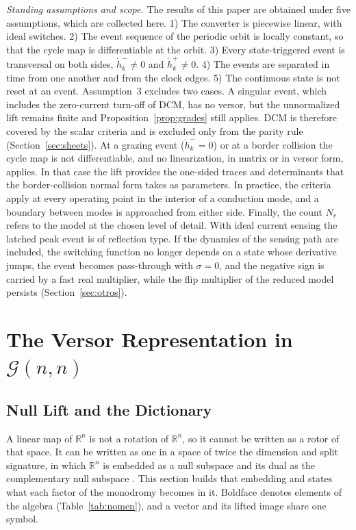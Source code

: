 \documentclass[journal]{IEEEtran}
\newcommand{\Gnn}{\mathcal{G}(n,n)}
\begin{document}
\emph{Standing assumptions and scope.} The results of this paper are obtained
under five assumptions, which are collected here. 1) The converter is
piecewise linear, with ideal switches. 2) The event sequence of the periodic
orbit is locally constant, so that the cycle map is differentiable at the
orbit. 3) Every state-triggered event is transversal on both sides,
$\dot h_k^{-}\neq0$ and $\dot h_k^{+}\neq0$. 4) The events are separated in
time from one another and from the clock edges. 5) The continuous state is
not reset at an event. Assumption~3 excludes two cases.
A singular event, which includes the zero-current turn-off of DCM, has no
versor, but the unnormalized lift remains finite and
Proposition~\ref{prop:grades} still applies. DCM is therefore covered by the
scalar criteria and is excluded only from the parity rule
(Section~\ref{sec:sheets}). At a grazing event ($\dot h_k^{-}=0$) or at a
border collision the cycle map is not differentiable, and no linearization,
in matrix or in versor form, applies. In that case the lift provides the
one-sided traces and determinants that the border-collision normal form
takes as parameters. In practice, the criteria apply at every operating
point in the interior of a conduction mode, and a boundary between modes is
approached from either side. Finally, the count $N_r$ refers to the model at
the chosen level of detail. With ideal current sensing the latched peak event
is of reflection type. If the dynamics of the sensing path are included, the
switching function no longer depends on a state whose derivative jumps, the
event becomes pass-through with $\sigma=0$, and the negative sign is carried
by a fast real multiplier, while the flip multiplier of the reduced model
persists (Section~\ref{sec:otros}).

\section{The Versor Representation in $\Gnn$}
\label{sec:versors}

\subsection{Null Lift and the Dictionary}
A linear map of $\mathbb{R}^{n}$ is not a rotation of $\mathbb{R}^{n}$, so it
cannot be written as a rotor of that space. It can be written as one in a
space of twice the dimension and split signature, in which $\mathbb{R}^{n}$
is embedded as a null subspace and its dual as the complementary null
subspace \cite{doran1993lie}. This section builds that embedding and states
what each factor of the monodromy becomes in it. Boldface denotes elements of the algebra
(Table~\ref{tab:nomen}), and a vector and its lifted image share one symbol.
\end{document}
